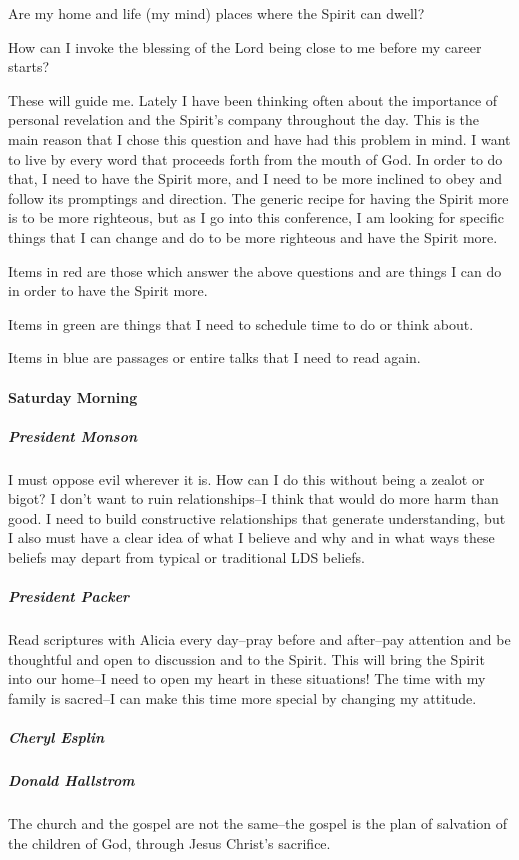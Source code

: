 Are my home and life (my mind) places where the Spirit can dwell?

How can I invoke the blessing of the Lord being close to me before my career starts?

These will guide me. Lately I have been thinking often about the importance of personal revelation and the Spirit's company throughout the day. This is the main reason that I chose this question and have had this problem in mind. I want to live by every word that proceeds forth from the mouth of God. In order to do that, I need to have the Spirit more, and I need to be more inclined to obey and follow its promptings and direction. The generic recipe for having the Spirit more is to be more righteous, but as I go into this conference, I am looking for specific things that I can change and do to be more righteous and have the Spirit more.

Items in red are those which answer the above questions and are things I can do in order to have the Spirit more.

Items in green are things that I need to schedule time to do or think about.

Items in blue are passages or entire talks that I need to read again.

\paragraph*{Saturday Morning}

\subparagraph*{President Monson} I must oppose evil wherever it is. How can I do this without being a zealot or bigot? I don't want to ruin relationships--I think that would do more harm than good. I need to build constructive relationships that generate understanding, but I also must have a clear idea of what I believe and why and in what ways these beliefs may depart from typical or traditional LDS beliefs.

\subparagraph*{President Packer} Read scriptures with Alicia every day--pray before and after--pay attention and be thoughtful and open to discussion and to the Spirit. This will bring the Spirit into our home--I need to open my heart in these situations! The time with my family is sacred--I can make this time more special by changing my attitude.

\subparagraph*{Cheryl Esplin}

\subparagraph*{Donald Hallstrom} The church and the gospel are not the same--the gospel is the plan of salvation of the children of God, through Jesus Christ's sacrifice.

